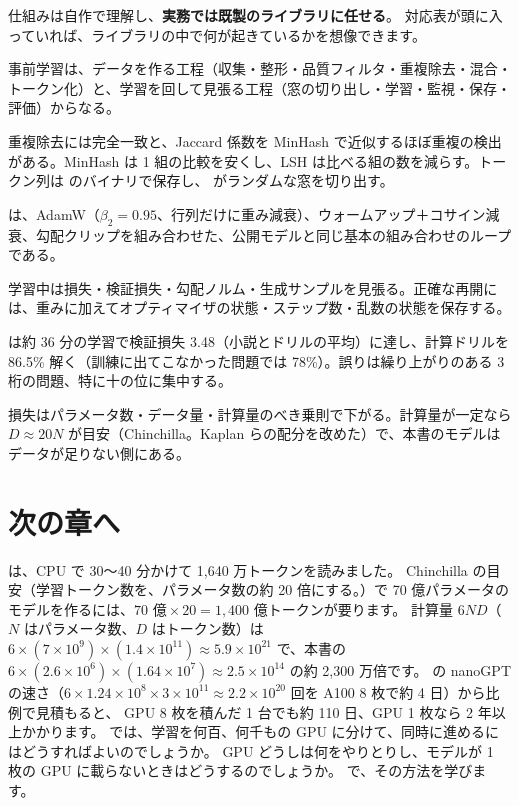 仕組みは自作で理解し、\textbf{実務では既製のライブラリに任せる}。
対応表が頭に入っていれば、ライブラリの中で何が起きているかを想像できます。

\begin{summary}
\item 事前学習は、データを作る工程（収集・整形・品質フィルタ・重複除去・混合・トークン化）と、学習を回して見張る工程（窓の切り出し・学習・監視・保存・評価）からなる。
\item 重複除去には完全一致と、Jaccard 係数を MinHash で近似するほぼ重複の検出がある。MinHash は 1 組の比較を安くし、LSH は比べる組の数を減らす。トークン列は  のバイナリで保存し、 がランダムな窓を切り出す。
\item {} は、AdamW（$\beta_2=0.95$、行列だけに重み減衰）、ウォームアップ＋コサイン減衰、勾配クリップを組み合わせた、公開モデルと同じ基本の組み合わせのループである。
\item 学習中は損失・検証損失・勾配ノルム・生成サンプルを見張る。正確な再開には、重みに加えてオプティマイザの状態・ステップ数・乱数の状態を保存する。
\item {} は約 36 分の学習で検証損失 3.48（小説とドリルの平均）に達し、計算ドリルを 86.5\% 解く（訓練に出てこなかった問題では 78\%）。誤りは繰り上がりのある 3 桁の問題、特に十の位に集中する。
\item 損失はパラメータ数・データ量・計算量のべき乗則で下がる。計算量が一定なら $D\approx 20N$ が目安（Chinchilla。Kaplan らの配分を改めた）で、本書のモデルはデータが足りない側にある。
\end{summary}

\section*{次の章へ}

 は、CPU で 30〜40 分かけて 1,640 万トークンを読みました。
Chinchilla の目安（学習トークン数を、パラメータ数の約 20 倍にする。）で 70 億パラメータのモデルを作るには、$70\text{ 億}\times20=1{,}400$ 億トークンが要ります。
計算量 $6ND$（$N$ はパラメータ数、$D$ はトークン数）は $6\times(7\times10^{9})\times(1.4\times10^{11})\approx 5.9\times10^{21}$ で、本書の $6\times(2.6\times10^{6})\times(1.64\times10^{7})\approx 2.5\times10^{14}$ の約 2,300 万倍です。
の nanoGPT の速さ（$6\times1.24\times10^{8}\times3\times10^{11}\approx2.2\times10^{20}$ 回を A100 8 枚で約 4 日）から比例で見積もると、
GPU 8 枚を積んだ 1 台でも約 110 日、GPU 1 枚なら 2 年以上かかります。
では、学習を何百、何千もの GPU に分けて、同時に進めるにはどうすればよいのでしょうか。
GPU どうしは何をやりとりし、モデルが 1 枚の GPU に載らないときはどうするのでしょうか。
で、その方法を学びます。

